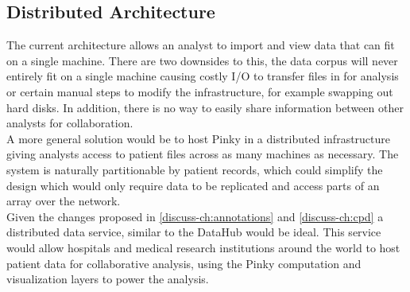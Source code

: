 \subsection{Distributed Architecture}\label{discuss-ch:dist-arch}

The current architecture allows an analyst to import and view data that can fit
on a single machine. There are two downsides to this, the data corpus will
never entirely fit on a single machine causing costly I/O to transfer files in
for analysis or certain manual steps to modify the infrastructure, for example
swapping out hard disks. In addition, there is no way to easily share
information between other analysts for collaboration. \\

A more general solution would be to host Pinky in a distributed infrastructure
giving analysts access to patient files across as many machines as necessary.
The system is naturally partitionable by patient records, which could simplify
the design which would only require data to be replicated and access parts of
an array over the network. \\

Given the changes proposed in \ref{discuss-ch:annotations} and \ref{discuss-ch:cpd} a
distributed data service, similar to the DataHub\cite{datahub} would be ideal.
This service would allow hospitals and medical research institutions around the
world to host patient data for collaborative analysis, using the Pinky
computation and visualization layers to power the analysis.

